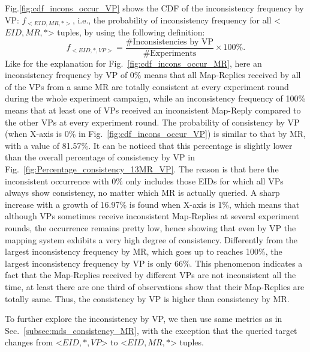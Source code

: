 Fig.\ref{fig:cdf_incons_occur_VP} shows the CDF of the inconsistency frequency by VP: $f_{<EID, MR, *>}$, i.e., the probability of inconsistency frequency for all <$EID,MR,*$> tuples, by using the following definition: 
\begin{equation}
f_{<EID, *, VP>} = \frac{\text{\# Inconsistencies by VP}}{\text{\# Experiments}}\times100\%.
\end{equation}
Like for the explanation for Fig.~\ref{fig:cdf_incons_occur_MR}, here an inconsistency frequency by VP of 0\% means that all Map-Replies received by all of the VPs from a same MR are totally consistent at every experiment round during the whole experiment campaign, while an inconsistency frequency of 100\% means that at least one of VPs received an inconsistent Map-Reply compared to the other VPs at every experiment round. The probability of consistency by VP (when X-axis is 0\% in Fig.~\ref{fig:cdf_incons_occur_VP}) is similar to that by MR, with a value of 81.57\%. It can be noticed that this percentage is slightly lower than the overall percentage of consistency by VP in Fig.~\ref{fig:Percentage_consistency_13MR_VP}. The reason is that here the inconsistent occurrence with 0\% only includes those EIDs for which all VPs always show consistency, no matter which MR is actually queried. A sharp increase with a growth of 16.97\% %
is found when X-axis is 1\%, which means that although VPs sometimes receive inconsistent Map-Replies at several experiment rounds, the occurrence remains pretty low, hence showing that even by VP  the mapping system exhibits a very high degree of consistency. Differently from the largest inconsistency frequency by MR, which goes up to reaches 100\%, the largest inconsistency frequency by VP is only 66\%. This phenomenon indicates a fact that the Map-Replies received by different VPs are not inconsistent all the time, at least there are one third of observations show that their Map-Replies are totally same. Thus, the consistency by VP is higher than consistency by MR.

To further explore the inconsistency by VP, we then use same metrics as in Sec.~\ref{subsec:mds_consistency_MR}, with the exception that the queried target changes from <$EID, *, VP$> to <$EID, MR, *$> tuples.

